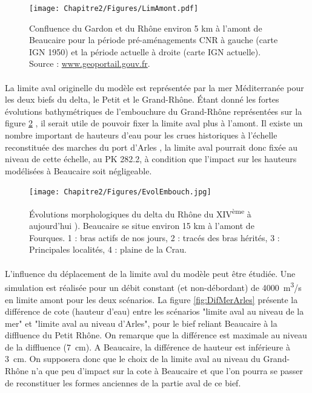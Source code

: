 	 \begin{figure}[h!]
		\centering
	    \texttt{[image: Chapitre2/Figures/LimAmont.pdf]}
        \caption{Confluence du Gardon et du Rhône environ 5 km à l'amont de Beaucaire pour la période pré-aménagements CNR à gauche (carte IGN 1950) et la période actuelle à droite (carte IGN actuelle). Source : \url{www.geoportail.gouv.fr}.}
		\label{fig:LimAmont}
	\end{figure}
	 
\FloatBarrier	 
	 
	\paragraph{} La limite aval originelle du modèle est représentée par la mer Méditerranée pour les deux biefs du delta, le Petit et le Grand-Rhône. Étant donné les fortes évolutions bathymétriques de l'embouchure du Grand-Rhône représentées sur la figure \ref{fig:Embouch} \citep{pichard_les_2014}, il serait utile de pouvoir fixer la limite aval plus à l'amont. Il existe un nombre important de hauteurs d'eau pour les crues historiques à l'échelle reconstituée des marches du port d'Arles \citep{pichard_les_1995}, la limite aval pourrait donc fixée au niveau de cette échelle, au PK 282.2, à condition que l'impact sur les hauteurs modélisées à Beaucaire soit négligeable.
	
	\begin{figure}[h]
		\centering
	    \texttt{[image: Chapitre2/Figures/EvolEmbouch.jpg]}
        \caption{Évolutions morphologiques du delta du Rhône du XIV\textsuperscript{ème} à aujourd'hui \citep{pichard_les_2014}). Beaucaire se situe environ 15 km à l'amont de Fourques. 1 : bras actifs de nos jours, 2 : tracés des bras hérités, 3 : Principales localités, 4 : plaine de la Crau.}
		\label{fig:Embouch}
	\end{figure}

	\paragraph{} L'influence du déplacement de la limite aval du modèle peut être étudiée. Une simulation est réalisée pour un débit constant (et non-débordant) de 4000~m\textsuperscript{3}/s en limite amont pour les deux scénarios. La figure \ref{fig:DifMerArles} présente la différence de cote (hauteur d'eau) entre les scénarios "limite aval au niveau de la mer" et "limite aval au niveau d'Arles", pour le bief reliant Beaucaire à la diffluence du Petit Rhône. On remarque que la différence est maximale au niveau de la diffluence (7~cm). A Beaucaire, la différence de hauteur est inférieure à 3~cm. On supposera donc que le choix de la limite aval au niveau du Grand-Rhône n'a que peu d'impact sur la cote à Beaucaire et que l'on pourra se passer de reconstituer les formes anciennes de la partie aval de ce bief. 
	 
